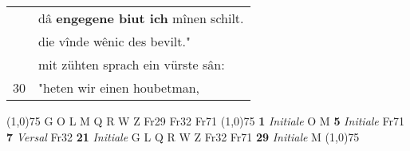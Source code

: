 \documentclass[8pt,a4paper,notitlepage]{article}
\begin{document}
\begin{table}[ht]
\begin{minipage}[t]{0.5\linewidth}
\begin{tabular}{rl}
 & dâ \textbf{engegene biut ich} mînen schilt.\\ 
 & die vînde wênic des bevilt."\\ 
 & mit zühten sprach ein vürste sân:\\ 
30 & "heten wir einen houbetman,\\ 
\end{tabular}
\scriptsize
\line(1,0){75} \newline
G O L M Q R W Z Fr29 Fr32 Fr71 \newline
\line(1,0){75} \newline
\textbf{1} \textit{Initiale} O M  \textbf{5} \textit{Initiale} Fr71  \textbf{7} \textit{Versal} Fr32  \textbf{21} \textit{Initiale} G L Q R W Z Fr32 Fr71  \textbf{29} \textit{Initiale} M  \newline
\line(1,0){75} \newline

\end{minipage}
\end{table}
\end{document}

